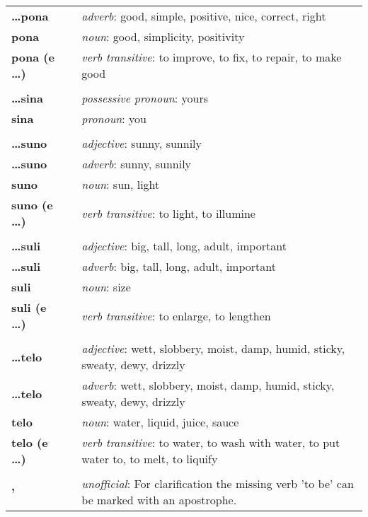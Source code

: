 \begin{supertabular}{p{2,5cm}|ll}
\textbf{\dots pona} && \textit{adverb}: good, simple, positive, nice, correct, right \\ %
\textbf{pona} && \textit{noun}: good, simplicity, positivity \\ %
\textbf{pona (e \dots)} && \textit{verb transitive}: to improve, to fix, to repair, to make good \\ %
 && \\ %
\textbf{\dots sina} && \textit{possessive pronoun}: yours \\  %
\textbf{sina} && \textit{pronoun}: you \\ %
 && \\ %
\textbf{\dots suno} && \textit{adjective}: sunny, sunnily \\ %
\textbf{\dots suno} && \textit{adverb}: sunny, sunnily \\ %
\textbf{suno} && \textit{noun}: sun, light \\ %
\textbf{suno (e \dots)} && \textit{verb transitive}: to light, to illumine \\ %
 && \\ %
\textbf{\dots suli} && \textit{adjective}: big, tall, long, adult, important \\ %
\textbf{\dots suli} && \textit{adverb}: big, tall, long, adult, important \\ %
\textbf{suli} && \textit{noun}: size \\ %
\textbf{suli (e \dots)} && \textit{verb transitive}: to enlarge, to lengthen \\ %
 && \\ %
\textbf{\dots telo} && \textit{adjective}: wett, slobbery, moist, damp, humid, sticky, sweaty, dewy, drizzly \\ %
\textbf{\dots telo} && \textit{adverb}: wett, slobbery, moist, damp, humid, sticky, sweaty, dewy, drizzly \\ %
\textbf{telo} && \textit{noun}: water, liquid, juice, sauce \\ %
\textbf{telo (e \dots)} && \textit{verb transitive}: to water, to wash with water, to put water to, to melt, to liquify \\ %
 && \\ %
\textbf{'} && \textit{unofficial}: For clarification the missing verb 'to be' can be marked with an apostrophe.  \\ %
\end{supertabular} \\
%
\newpage
